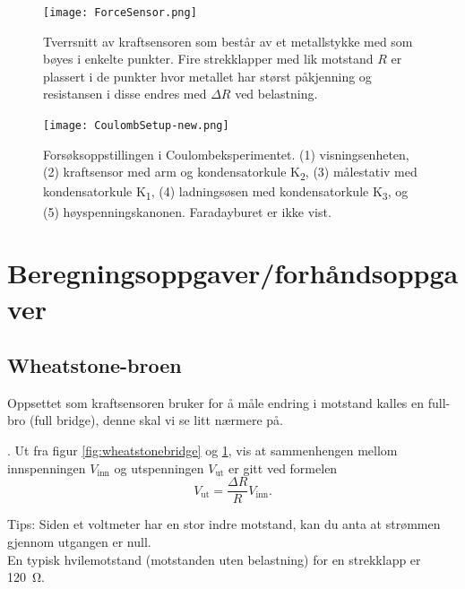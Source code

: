 \documentclass[../Elmag-labhefte-2020.tex]{subfiles}
\begin{document}
\begin{figure}[!htbp]
    \centering
    \texttt{[image: ForceSensor.png]}
    \caption{%
        Tverrsnitt av kraftsensoren som består av et metallstykke med som bøyes i enkelte punkter. Fire strekklapper med lik motstand $R$ er plassert i de punkter hvor metallet har størst påkjenning og resistansen i disse endres med $\Delta R$ ved belastning.
    }
    \label{fig:ForceSensor}
\end{figure}

\begin{figure}[h!t]
    \centering
    \texttt{[image: CoulombSetup-new.png]}
    \vspace{-2mm}
    \caption{%
        Forsøksoppstillingen i Coulombeksperimentet. 
	        (1) visningsenheten, 
	        (2) kraftsensor med arm og kondensatorkule K\textsubscript{2}, 
	        (3) målestativ med kondensatorkule K\textsubscript{1}, 
	        (4) ladningsøsen med kondensatorkule K\textsubscript{3}, og
	        (5) høyspenningskanonen.
        Faradayburet er ikke vist.
     }
   \label{fig:CoulombSetUp_new}
\end{figure}

\clearpage


\section{Beregningsoppgaver/forhåndsoppgaver \label{ch.coulomb.beregn}}
\subsection{Wheatstone-broen}
Oppsettet som kraftsensoren bruker for å måle endring i motstand kalles en full-bro (full bridge), denne skal vi se litt nærmere på.

{. Ut fra figur \ref{fig:wheatstonebridge} og \ref{fig:ForceSensor}, vis at sammenhengen mellom innspenningen $V_\text{inn}$ og utspenningen $V_\text{ut}$ er gitt ved formelen }
\begin{equation}
    \label{eq:fullbridge}
    V_\text{ut} = \frac{\Delta R}  {R} V_\text{inn} .
\end{equation}

Tips: Siden et voltmeter har en stor indre motstand, kan du anta at strømmen gjennom utgangen er null.\\
En typisk hvilemotstand (motstanden uten belastning) for en strekklapp er \SI{120}{\ohm}.
\end{document}
